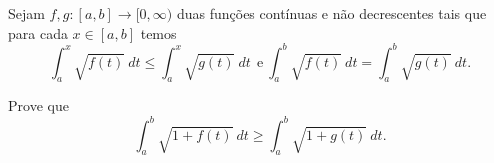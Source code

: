 Sejam \(f,g\colon [a,b]\to [0,\infty)\) duas funções contínuas e não decrescentes tais que para cada \(x\in [a,b]\) temos
\[ \int^x_a \sqrt { f(t) }\ dt \leq \int^x_a \sqrt { g(t) }\ dt  \ \  \textrm{e}\ \int^b_a \sqrt {f(t)}\ dt = \int^b_a \sqrt { g(t)}\ dt. \]

Prove que
\[ \int^b_a \sqrt { 1+ f(t) }\ dt \geq \int^b_a \sqrt { 1 + g(t) }\ dt. \]
